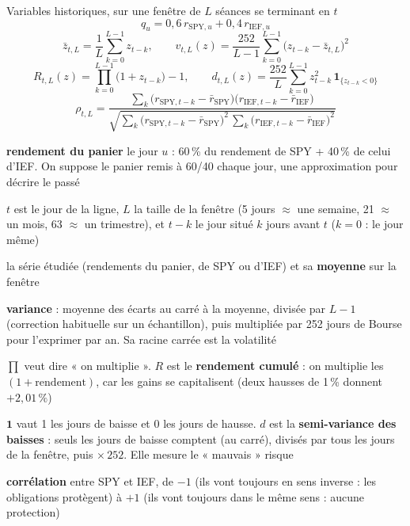 \documentclass[10pt,a4paper]{article}
\newcommand{\SPY}{\mathrm{SPY}}
\newcommand{\IEF}{\mathrm{IEF}}
\newcommand{\notation}[2]{\makebox[2.3cm][l]{#1}\parbox[t]{\dimexpr\linewidth-2.3cm\relax}{#2}\par}
\begin{document}
\begin{formule}{Variables historiques, sur une fenêtre de $L$ séances se terminant en $t$}
\begin{equation}\label{eq:panier}
q_u=0{,}6\,r_{\SPY,u}+0{,}4\,r_{\IEF,u}
\end{equation}
\begin{equation}\label{eq:variance}
\bar z_{t,L}=\frac1L\sum_{k=0}^{L-1}z_{t-k},\qquad
v_{t,L}(z)=\frac{252}{L-1}\sum_{k=0}^{L-1}\bigl(z_{t-k}-\bar z_{t,L}\bigr)^2
\end{equation}
\begin{equation}\label{eq:cumul}
R_{t,L}(z)=\prod_{k=0}^{L-1}\bigl(1+z_{t-k}\bigr)-1,\qquad
d_{t,L}(z)=\frac{252}{L}\sum_{k=0}^{L-1}z_{t-k}^2\,\mathbf{1}_{\{z_{t-k}<0\}}
\end{equation}
\begin{equation}\label{eq:correlation}
\rho_{t,L}=\frac{\sum_k\bigl(r_{\SPY,t-k}-\bar r_{\SPY}\bigr)\bigl(r_{\IEF,t-k}-\bar r_{\IEF}\bigr)}{\sqrt{\sum_k\bigl(r_{\SPY,t-k}-\bar r_{\SPY}\bigr)^2\,\sum_k\bigl(r_{\IEF,t-k}-\bar r_{\IEF}\bigr)^2}}
\end{equation}
\notation{$q_u$}{\textbf{rendement du panier} le jour $u$ : 60\,\% du rendement de SPY + 40\,\% de celui d'IEF. On suppose le panier remis à 60/40 chaque jour, une approximation pour décrire le passé}
\notation{$t,\ L,\ k$}{$t$ est le jour de la ligne, $L$ la taille de la fenêtre (5 jours $\approx$ une semaine, 21 $\approx$ un mois, 63 $\approx$ un trimestre), et $t-k$ le jour situé $k$ jours avant $t$ ($k=0$ : le jour même)}
\notation{$z,\ \bar z_{t,L}$}{la série étudiée (rendements du panier, de SPY ou d'IEF) et sa \textbf{moyenne} sur la fenêtre}
\notation{$v_{t,L}$}{\textbf{variance} : moyenne des écarts au carré à la moyenne, divisée par $L-1$ (correction habituelle sur un échantillon), puis multipliée par 252 jours de Bourse pour l'exprimer par an. Sa racine carrée est la volatilité}
\notation{$\prod,\ R_{t,L}$}{$\prod$ veut dire « on multiplie ». $R$ est le \textbf{rendement cumulé} : on multiplie les $(1+\text{rendement})$, car les gains se capitalisent (deux hausses de 1\,\% donnent $+2{,}01\,\%$)}
\notation{$\mathbf{1}_{\{z<0\}},\ d_{t,L}$}{$\mathbf{1}$ vaut 1 les jours de baisse et 0 les jours de hausse. $d$ est la \textbf{semi-variance des baisses} : seuls les jours de baisse comptent (au carré), divisés par tous les jours de la fenêtre, puis $\times\,252$. Elle mesure le « mauvais » risque}
\notation{$\rho_{t,L}$}{\textbf{corrélation} entre SPY et IEF, de $-1$ (ils vont toujours en sens inverse : les obligations protègent) à $+1$ (ils vont toujours dans le même sens : aucune protection)}
\end{formule}
\end{document}
